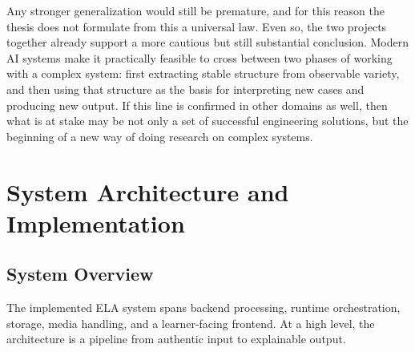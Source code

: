 \documentclass[12pt,a4paper,oneside]{report}
\begin{document}
Any stronger generalization would still be premature, and for this reason the thesis does not formulate from this a universal law. Even so, the two projects together already support a more cautious but still substantial conclusion. Modern AI systems make it practically feasible to cross between two phases of working with a complex system: first extracting stable structure from observable variety, and then using that structure as the basis for interpreting new cases and producing new output. If this line is confirmed in other domains as well, then what is at stake may be not only a set of successful engineering solutions, but the beginning of a new way of doing research on complex systems.

\chapter{System Architecture and Implementation}
\section{System Overview}
The implemented ELA system spans backend processing, runtime orchestration, storage, media handling, and a learner-facing frontend. At a high level, the architecture is a pipeline from authentic input to explainable output.
\end{document}
